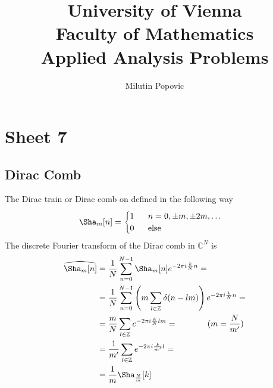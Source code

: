 \documentclass[a4paper]{article}
\title{University of Vienna\\ Faculty of Mathematics\\
\vspace{1cm}Applied Analysis Problems
}
\author{Milutin Popovic}
\begin{document}
\maketitle
\tableofcontents

\section{Sheet 7}
\subsection{Dirac Comb}
The Dirac train or Dirac comb on defined in the following way
\begin{align}
    \Sha_m[n] =
    \begin{cases}
        1\;\;\;\;\;\; n = 0, \pm m, \pm 2m,\dots\\
        0\;\;\;\;\;\; \text{else}
    \end{cases}
\end{align}
The discrete Fourier transform of the Dirac comb in $\mathbb{C}^N$ is
\begin{align}
    \widehat{\Sha_m[n]}
    &=\frac{1}{N}\sum_{n=0}^{N-1} \Sha_m[n] e^{-2\pi i \frac{k}{N}n}=\\
    &=\frac{1}{N}\sum_{n=0}^{N-1}
        \left(
            m\sum_{l\in\mathbb{Z}} \delta(n-lm)
            \right)
            e^{-2\pi i \frac{k}{N}n}=\\
    &=\frac{m}{N}\sum_{l\in\mathbb{Z}} e^{-2\pi i \frac{k}{N}lm}=
    \;\;\;\;\;\;\;\;\;\;\;\;\; (m = \frac{N}{m'})\\
    &= \frac{1}{m'} \sum_{l\in\mathbb{Z}} e^{-2\pi i \frac{k}{m'}l} =\\
    &= \frac{1}{m}\Sha_{\frac{N}{m}}[k]
\end{align}
\end{document}
